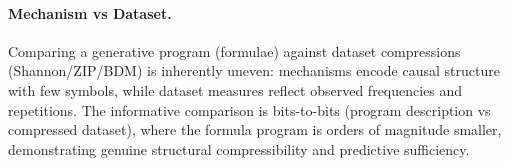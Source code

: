 \paragraph{Mechanism vs Dataset.} Comparing a generative program (formulae) against dataset compressions (Shannon/ZIP/BDM) is inherently uneven: mechanisms encode causal structure with few symbols, while dataset measures reflect observed frequencies and repetitions. The informative comparison is bits-to-bits (program description vs compressed dataset), where the formula program is orders of magnitude smaller, demonstrating genuine structural compressibility and predictive sufficiency.

